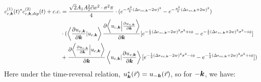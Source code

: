 \begin{equation}
\begin{aligned}
    c^{(1)}_{c,\boldsymbol k}(t)^* c^{(2)}_{c,\boldsymbol k,dip}(t) +c.c.&=\frac{\sqrt{2}A_1A_2^2 \vec e w^2 \cdot \sigma^2 \pi}{4}\cdot(e^{-\frac{\sigma^2}{4} (\Delta \epsilon_{vc,\boldsymbol k}-2w)^2}-e^{-\frac{\sigma^2}{4} (\Delta \epsilon_{vc,\boldsymbol k}+2w)^2})\\
    &\cdot (\left \langle \frac{\partial u_{v,\boldsymbol k}}{\partial \boldsymbol k} |  u_{c,\boldsymbol k} \right \rangle \frac{\partial{\left \langle u_{c,\boldsymbol k}\Big |\frac{\partial u_{v,\boldsymbol k}}{\partial \boldsymbol k} \right \rangle}}{\partial {\boldsymbol k}} 
    [e^{-\frac{1}{2}(\Delta \epsilon_{vc,\boldsymbol k} - 2w)^2 \sigma^2+i\phi}
    -e^{-\frac{1}{2}(\Delta \epsilon_{vc,\boldsymbol k} + 2w)^2 \sigma^2-i\phi}]\\
    &+ \frac{\partial{\left \langle \frac{\partial u_{v,\boldsymbol k}}{\partial \boldsymbol k} \Big |u_{c,\boldsymbol k} \right \rangle}}{\partial {\boldsymbol k}} 
    \left \langle  u_{c,\boldsymbol k}| \frac{\partial u_{v,\boldsymbol k}}{\partial \boldsymbol k} \right \rangle 
    [e^{-\frac{1}{2}(\Delta \epsilon_{vc,\boldsymbol k} - 2w)^2 \sigma^2-i\phi}
    -e^{-\frac{1}{2}(\Delta \epsilon_{vc,\boldsymbol k} + 2w)^2 \sigma^2+i\phi}])
\end{aligned}
\end{equation}
 Here under the time-reversal relation, $u^*_{\boldsymbol k}(\vec r)= u_{-\boldsymbol k}(\vec r)$, so for $-\boldsymbol k$, we have:
 
